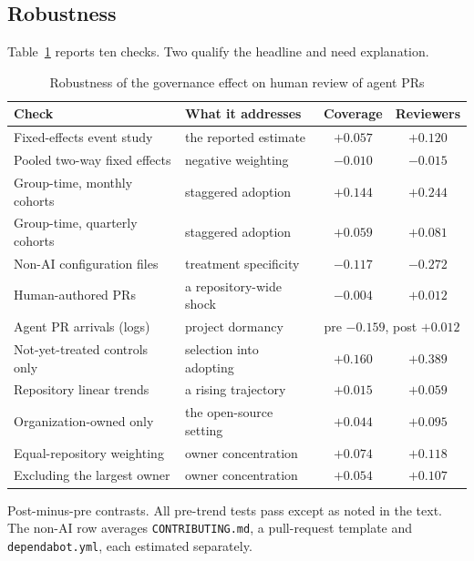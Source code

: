 \documentclass[mnsc]{informs4}
\begin{document}
\subsection{Robustness}

Table~\ref{tab:robust} reports ten checks. Two qualify the headline and need
explanation.

\begin{table}[t]
\caption{Robustness of the governance effect on human review of agent PRs}
\label{tab:robust}
\centering\small
\begin{tabular}{llcc}
\toprule
Check & What it addresses & Coverage & Reviewers \\
\midrule
Fixed-effects event study & the reported estimate & $+0.057$ & $+0.120$ \\
Pooled two-way fixed effects & negative weighting & $-0.010$ & $-0.015$ \\
Group-time, monthly cohorts & staggered adoption & $+0.144$ & $+0.244$ \\
Group-time, quarterly cohorts & staggered adoption & $+0.059$ & $+0.081$ \\[3pt]
Non-AI configuration files & treatment specificity & $-0.117$ & $-0.272$ \\
Human-authored PRs & a repository-wide shock & $-0.004$ & $+0.012$ \\
Agent PR arrivals (logs) & project dormancy & \multicolumn{2}{c}{pre $-0.159$, post $+0.012$} \\[3pt]
Not-yet-treated controls only & selection into adopting & $+0.160$ & $+0.389$ \\
Repository linear trends & a rising trajectory & $+0.015$ & $+0.059$ \\
Organization-owned only & the open-source setting & $+0.044$ & $+0.095$ \\
Equal-repository weighting & owner concentration & $+0.074$ & $+0.118$ \\
Excluding the largest owner & owner concentration & $+0.054$ & $+0.107$ \\
\bottomrule
\end{tabular}
\par\vspace{2pt}
\footnotesize Post-minus-pre contrasts. All pre-trend tests pass except as noted in
the text. The non-AI row averages \texttt{CONTRIBUTING.md}, a pull-request template
and \texttt{dependabot.yml}, each estimated separately.
\end{table}
\end{document}
